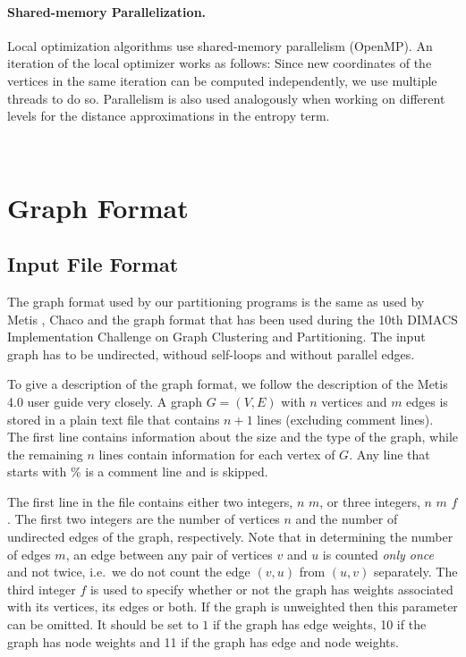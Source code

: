 \documentclass[11pt]{article}
\newcommand{\ie}{i.e.\ }
\begin{document}
\paragraph{Shared-memory Parallelization.}
%
Local optimization algorithms use shared-memory parallelism (OpenMP).
An iteration of the local optimizer works as follows: Since new coordinates of the vertices in the same iteration can be computed independently, we use multiple threads to do so. 
Parallelism is also used analogously when working on different levels for the distance approximations
in the entropy term.



\vfill
\pagebreak
\,
\pagebreak
\section{Graph Format}
\label{ss:graphformat}
\subsection{Input File Format}
The graph format used by our partitioning programs is the same as used by Metis \cite{karypis1998fast}, Chaco \cite{chaco} and the graph format that has been used during the 10th DIMACS Implementation Challenge on Graph Clustering and Partitioning. 
The input graph has to be undirected, withoud self-loops and without parallel edges.

To give a description of the graph format, we follow the description of the Metis 4.0 user guide very closely. A graph $G=(V,E)$ with $n$ vertices and $m$ edges is stored in a plain text file that contains $n+1$ lines (excluding comment lines). The first line contains information about the size and the type of the graph, while the remaining $n$ lines contain information for each vertex of $G$. Any line that starts with \% is a comment line and is skipped.

The first line in the file contains either two integers, $n$ $m$, or three integers, $n$ $m$ $f$. The first two integers are the number of vertices $n$ and the number of undirected edges of the graph, respectively. Note that in determining the number of edges $m$, an edge between any pair of vertices $v$ and $u$ is counted \emph{only once} and not twice, \ie we do not count the edge $(v,u)$ from $(u,v)$ separately. The third integer $f$ is used to specify whether or not the graph has weights associated with its vertices, its edges or both. If the graph is unweighted then this parameter can be omitted. It should be set to $1$ if the graph has edge weights, 10 if the graph has node weights and 11 if the graph has edge and node weights.
\end{document}
